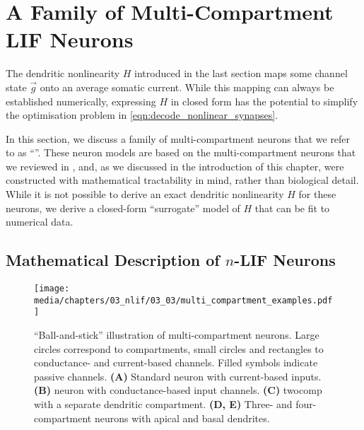 
\section{A Family of Multi-Compartment LIF Neurons}
\label{sec:nlif}

The dendritic nonlinearity $H$ introduced in the last section maps some channel state $\vec g$ onto an average somatic current.
While this mapping can always be established numerically, expressing $H$ in closed form has the potential to simplify the optimisation problem in \cref{eqn:decode_nonlinear_synapses}.

In this section, we discuss a family of multi-compartment \LIF neurons that we refer to as \enquote{\nlif}.
These neuron models are based on the multi-compartment neurons that we reviewed in , and, as we discussed in the introduction of this chapter, were constructed with mathematical tractability in mind, rather than biological detail.
While it is not possible to derive an exact dendritic nonlinearity $H$ for these neurons, we derive a closed-form \enquote{surrogate} model of $H$ that can be fit to numerical data.

\subsection{Mathematical Description of $n$-LIF Neurons}
\label{sec:nlif_description}

\begin{figure}
	\texttt{[image: media/chapters/03\_nlif/03\_03/multi\_compartment\_examples.pdf]}%
	{\label{fig:nlif_a}}%
	{\label{fig:nlif_b}}%
	{\label{fig:nlif_c}}%
	{\label{fig:nlif_d}}%
	{\label{fig:nlif_e}}%
	\caption[\enquote{Ball-and-stick} illustration of multi-compartment LIF neurons]{\enquote{Ball-and-stick} illustration of multi-compartment \LIF neurons.
	Large circles correspond to compartments, small circles and rectangles to conductance- and current-based channels. Filled symbols indicate passive channels.
	\textbf{(A)} Standard \LIF neuron with current-based inputs.
	\textbf{(B)} \LIF neuron with conductance-based input channels.
	\textbf{(C)} \Gls{twocomp} with a separate dendritic compartment.
	\textbf{(D, E)} Three- and four-compartment \LIF neurons with apical and basal dendrites.}
	\label{fig:nlif}
\end{figure}


